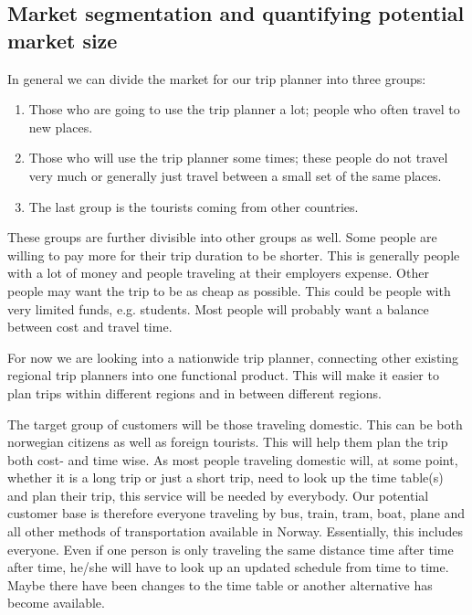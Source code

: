 \subsection{Market segmentation and quantifying potential market size}
In general we can divide the market for our trip planner into three groups:
\begin{enumerate}
	\item{Those who are going to use the trip planner a lot; people who often travel to new places.}
	\item{Those who will use the trip planner some times; these people do not travel very much or generally just travel between a small set of the same places.}
	\item{The last group is the tourists coming from other countries.}
\end{enumerate}
These groups are further divisible into other groups as well. Some people are willing to pay more for their trip duration to be shorter. This is generally people with a lot of money and people traveling at their employers expense. Other people may want the trip to be as cheap as possible. This could be people with very limited funds, e.g. students.
Most people will probably want a balance between cost and travel time.

For now we are looking into a nationwide trip planner, connecting other existing regional trip planners into one functional product. This will make it easier to plan trips within different regions and in between different regions.

The target group of customers will be those traveling domestic. This can be both norwegian citizens as well as foreign tourists. This will help them plan the trip both cost- and time wise.
As most people traveling domestic will, at some point, whether it is a long trip or just a short trip, need to look up the time table(s) and plan their trip, this service will be needed by everybody.
Our potential customer base is therefore everyone traveling by bus, train, tram, boat, plane and all other methods of transportation available in Norway. Essentially, this includes everyone.
Even if one person is only traveling the same distance time after time after time, he/she will have to look up an updated schedule from time to time.
Maybe there have been changes to the time table or another alternative has become available.

